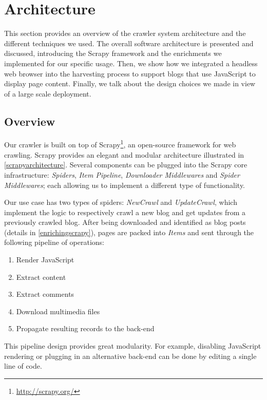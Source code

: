 \section{Architecture}
\label{architecture}

This section provides an overview of the crawler system architecture and the different techniques we used. The overall software architecture is presented and discussed, introducing the Scrapy framework and the enrichments we implemented for our specific usage. Then, we show how we integrated a headless web browser into the harvesting process to support blogs that use JavaScript to display page content. Finally, we talk about the design choices we made in view of a large scale deployment.


\subsection{Overview}

Our crawler is built on top of Scrapy\footnote{\label{scrapy}\url{http://scrapy.org/}}, an open-source framework for web crawling. Scrapy provides an elegant and modular architecture illustrated in \autoref{scrapyarchitecture}. Several components can be plugged into the Scrapy core infrastructure: \emph{Spiders}, \emph{Item Pipeline}, \emph{Downloader Middlewares} and \emph{Spider Middlewares}; each allowing us to implement a different type of functionality.

Our use case has two types of spiders: \emph{NewCrawl} and \emph{UpdateCrawl}, which implement the logic to respectively crawl a new blog and get updates from a previously crawled blog. After being downloaded and identified as blog posts (details in \autoref{enrichingscrapy}), pages are packed into \emph{Items} and sent through the following pipeline of operations:
\begin{enumerate}
  \item Render JavaScript
  \item Extract content
  \item Extract comments
  \item Download multimedia files
  \item Propagate resulting records to the back-end
\end{enumerate}
This pipeline design provides great modularity. For example, disabling JavaScript rendering or plugging in an alternative back-end can be done by editing a single line of code.

